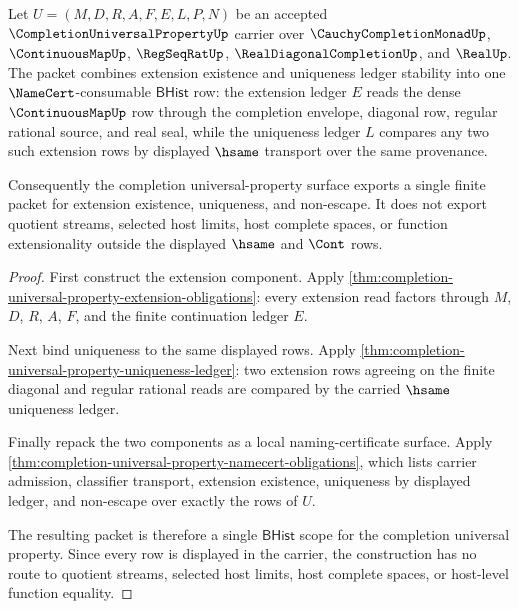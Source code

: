 \begin{theorem}
\label{thm:completion-universal-property-extension-uniqueness-scope}
Let $U=(M,D,R,A,F,E,L,P,N)$ be an accepted $\CompletionUniversalPropertyUp$ carrier over $\CauchyCompletionMonadUp$, $\ContinuousMapUp$, $\RegSeqRatUp$, $\RealDiagonalCompletionUp$, and $\RealUp$. The packet combines extension existence and uniqueness ledger stability into one $\NameCert$-consumable $\mathsf{BHist}$ row: the extension ledger $E$ reads the dense $\ContinuousMapUp$ row through the completion envelope, diagonal row, regular rational source, and real seal, while the uniqueness ledger $L$ compares any two such extension rows by displayed $\hsame$ transport over the same provenance.

Consequently the completion universal-property surface exports a single finite packet for extension existence, uniqueness, and non-escape. It does not export quotient streams, selected host limits, host complete spaces, or function extensionality outside the displayed $\hsame$ and $\Cont$ rows.
\end{theorem}
\begin{proof}
First construct the extension component. Apply \autoref{thm:completion-universal-property-extension-obligations}: every extension read factors through $M$, $D$, $R$, $A$, $F$, and the finite continuation ledger $E$.

Next bind uniqueness to the same displayed rows. Apply \autoref{thm:completion-universal-property-uniqueness-ledger}: two extension rows agreeing on the finite diagonal and regular rational reads are compared by the carried $\hsame$ uniqueness ledger.

Finally repack the two components as a local naming-certificate surface. Apply \autoref{thm:completion-universal-property-namecert-obligations}, which lists carrier admission, classifier transport, extension existence, uniqueness by displayed ledger, and non-escape over exactly the rows of $U$.

The resulting packet is therefore a single $\mathsf{BHist}$ scope for the completion universal property. Since every row is displayed in the carrier, the construction has no route to quotient streams, selected host limits, host complete spaces, or host-level function equality.
\end{proof}

